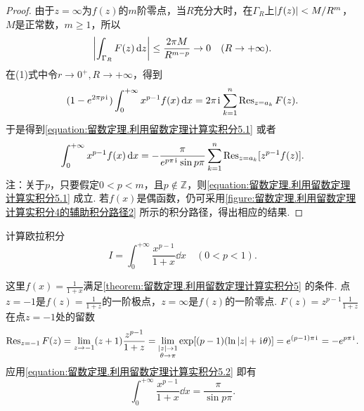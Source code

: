 \begin{theorem}
\begin{proof}
由于\(z=\infty\)为\(f(z)\)的\(m\)阶零点，当\(R\)充分大时，在\(\Gamma_R\)上\(\abs{f(z)}<M/R^m\)，\(M\)是正常数，\(m\geq1\)，所以\[
\abs{\int_{\Gamma_R} F(z) \dd{z}}
\leq \frac{2\pi M}{R^{m-p}} \to0\quad(R\to+\infty).
\]在(1)式中令\(r\to0^+,R\to+\infty\)，得到\[
(1-e^{2\pi p\kern1pt\mathrm{i}\kern1pt}) \int_0^{+\infty} x^{p-1} f(x) \dd{x}
= 2\pi\kern1pt\mathrm{i}\kern1pt \sum\limits_{k=1}^n \operatorname{Res}_{z=a_k} F(z).
\]于是得到\cref{equation:留数定理.利用留数定理计算实积分5.1} 或者\begin{equation}\label{equation:留数定理.利用留数定理计算实积分5.2}
\int_0^{+\infty} x^{p-1} f(x) \dd{x}
= -\frac{\pi}{e^{p\pi\kern1pt\mathrm{i}\kern1pt} \sin p\pi} \sum\limits_{k=1}^n \operatorname{Res}_{z=a_k}[z^{p-1} f(z)].
\end{equation}
注：关于\(p\)，只要假定\(0<p<m\)，且\(p\notin\mathbb{Z}\)，则\cref{equation:留数定理.利用留数定理计算实积分5.1} 成立.
若\(f(x)\)是偶函数，仍可采用\cref{figure:留数定理.利用留数定理计算实积分4的辅助积分路径2} 所示的积分路径，得出相应的结果.
\end{proof}
\end{theorem}

\begin{example}
计算欧拉积分\[
I = \int_0^{+\infty} \frac{x^{p-1}}{1+x} \dd{x} \quad(0<p<1).
\]
\begin{solution}
这里\(f(x) = \frac{1}{1+x}\)满足\cref{theorem:留数定理.利用留数定理计算实积分5} 的条件.
点\(z=-1\)是\(f(z) = \frac{1}{1+z}\)的一阶极点，\(z=\infty\)是\(f(z)\)的一阶零点.
\(F(z) = z^{p-1} \frac{1}{1+z}\)在点\(z=-1\)处的留数\[
\operatorname{Res}_{z=-1} F(z)
= \lim\limits_{z\to-1} (z+1) \frac{z^{p-1}}{1+z}
= \lim\limits_{\substack{\abs{z}\to1 \\ \theta\to\pi}} \exp[(p-1)(\ln\abs{z}+\kern1pt\mathrm{i}\kern1pt\theta)]
= e^{(p-1)\pi\kern1pt\mathrm{i}\kern1pt}
= -e^{p\pi\kern1pt\mathrm{i}\kern1pt}.
\]应用\cref{equation:留数定理.利用留数定理计算实积分5.2} 即有\begin{equation}
\int_0^{+\infty} \frac{x^{p-1}}{1+x} \dd{x} = \frac{\pi}{\sin p\pi}.
\end{equation}
\end{solution}
\end{example}

